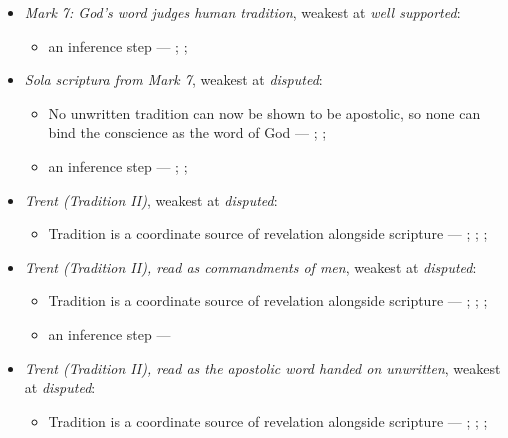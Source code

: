 \documentclass[11pt]{article}
\begin{document}
\begin{itemize}
\item \emph{Mark 7: God’s word judges human tradition}, weakest at \emph{well supported}:
\begin{itemize}
\item an inference step --- \cite[Vatican II (1965), Dei Verbum 10]{tanner-decrees-1990}; \cite[IV.x.23]{calvin-institutes-1960}; \cite[15--16]{wenham-our-lords-view-1953}
\end{itemize}
\item \emph{Sola scriptura from Mark 7}, weakest at \emph{disputed}:
\begin{itemize}
\item No unwritten tradition can now be shown to be apostolic, so none can bind the conscience as the word of God --- \cite[503--511]{whitaker-disputation-1849}; \cite[594]{whitaker-disputation-1849}; \cite[I.6]{westminster-confession-1647}
\item an inference step --- \cite{geiselmann-meaning-of-tradition-1966}; \cite[Vatican I (1870), Pastor Aeternus, ch. 4]{tanner-decrees-1990}; \cite{florovsky-bible-church-tradition-1972}
\end{itemize}
\item \emph{Trent (Tradition II)}, weakest at \emph{disputed}:
\begin{itemize}
\item Tradition is a coordinate source of revelation alongside scripture --- \cite[Trent, Session IV (1546), Decree on Sacred Books and Traditions]{tanner-decrees-1990}; \cite{mathison-shape-sola-scriptura-2001}; \cite{geiselmann-meaning-of-tradition-1966}; \cite{congar-tradition-and-traditions-1966}
\end{itemize}
\item \emph{Trent (Tradition II), read as commandments of men}, weakest at \emph{disputed}:
\begin{itemize}
\item Tradition is a coordinate source of revelation alongside scripture --- \cite[Trent, Session IV (1546), Decree on Sacred Books and Traditions]{tanner-decrees-1990}; \cite{mathison-shape-sola-scriptura-2001}; \cite{geiselmann-meaning-of-tradition-1966}; \cite{congar-tradition-and-traditions-1966}
\item an inference step --- \cite[IV.x.23]{calvin-institutes-1960}
\end{itemize}
\item \emph{Trent (Tradition II), read as the apostolic word handed on unwritten}, weakest at \emph{disputed}:
\begin{itemize}
\item Tradition is a coordinate source of revelation alongside scripture --- \cite[Trent, Session IV (1546), Decree on Sacred Books and Traditions]{tanner-decrees-1990}; \cite{mathison-shape-sola-scriptura-2001}; \cite{geiselmann-meaning-of-tradition-1966}; \cite{congar-tradition-and-traditions-1966}
\end{itemize}
\end{itemize}
\end{document}
